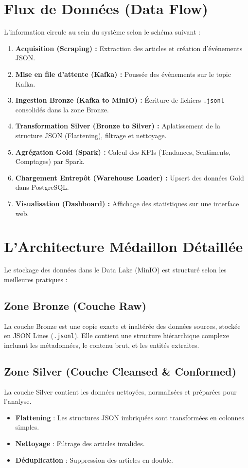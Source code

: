 \documentclass[12pt,a4paper]{report}
\begin{document}
\section{Flux de Données (Data Flow)}
L'information circule au sein du système selon le schéma suivant :
\begin{enumerate}
    \item \textbf{Acquisition (Scraping) :} Extraction des articles et création d'événements JSON.
    \item \textbf{Mise en file d'attente (Kafka) :} Poussée des événements sur le topic Kafka.
    \item \textbf{Ingestion Bronze (Kafka to MinIO) :} Écriture de fichiers \texttt{.jsonl} consolidés dans la zone Bronze.
    \item \textbf{Transformation Silver (Bronze to Silver) :} Aplatissement de la structure JSON (Flattening), filtrage et nettoyage.
    \item \textbf{Agrégation Gold (Spark) :} Calcul des KPIs (Tendances, Sentiments, Comptages) par Spark.
    \item \textbf{Chargement Entrepôt (Warehouse Loader) :} Upsert des données Gold dans PostgreSQL.
    \item \textbf{Visualisation (Dashboard) :} Affichage des statistiques sur une interface web.
\end{enumerate}

\section{L'Architecture Médaillon Détaillée}
Le stockage des données dans le Data Lake (MinIO) est structuré selon les meilleures pratiques :

\subsection{Zone Bronze (Couche Raw)}
La couche Bronze est une copie exacte et inaltérée des données sources, stockée en JSON Lines (\texttt{.jsonl}). Elle contient une structure hiérarchique complexe incluant les métadonnées, le contenu brut, et les entités extraites.

\subsection{Zone Silver (Couche Cleansed \& Conformed)}
La couche Silver contient les données nettoyées, normalisées et préparées pour l'analyse.
\begin{itemize}
    \item \textbf{Flattening} : Les structures JSON imbriquées sont transformées en colonnes simples.
    \item \textbf{Nettoyage} : Filtrage des articles invalides.
    \item \textbf{Déduplication} : Suppression des articles en double.
\end{itemize}
\end{document}

